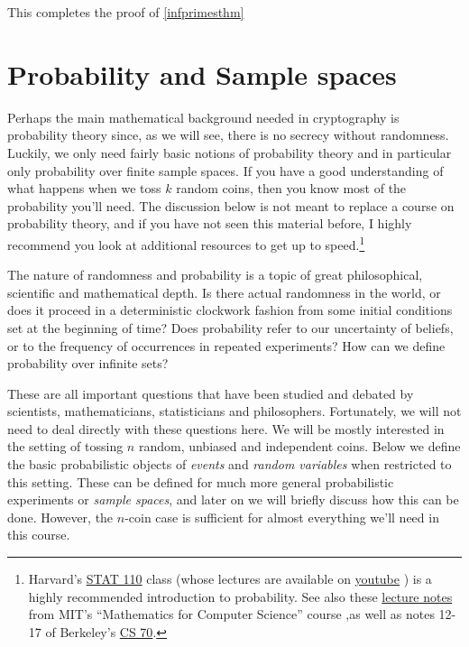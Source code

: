 This completes the proof of \cref{infprimesthm}

\section{Probability and Sample spaces}\label{0-Probability-and-Sample}

Perhaps the main mathematical background needed in cryptography is
probability theory since, as we will see, there is no secrecy without
randomness. Luckily, we only need fairly basic notions of probability
theory and in particular only probability over finite sample spaces. If
you have a good understanding of what happens when we toss \(k\) random
coins, then you know most of the probability you'll need. The discussion
below is not meant to replace a course on probability theory, and if you
have not seen this material before, I highly recommend you look at
additional resources to get up to speed.\footnote{Harvard's
  \href{http://projects.iq.harvard.edu/stat110/home}{STAT 110} class
  (whose lectures are available on
  \href{http://projects.iq.harvard.edu/stat110/youtube}{youtube} ) is a
  highly recommended introduction to probability. See also these
  \href{http://www.boazbarak.org/cs121/LLM_probability.pdf}{lecture
  notes} from MIT's ``Mathematics for Computer Science'' course ,as well
  as notes 12-17 of Berkeley's \href{https://www.eecs70.org/}{CS 70}.}

The nature of randomness and probability is a topic of great
philosophical, scientific and mathematical depth. Is there actual
randomness in the world, or does it proceed in a deterministic clockwork
fashion from some initial conditions set at the beginning of time? Does
probability refer to our uncertainty of beliefs, or to the frequency of
occurrences in repeated experiments? How can we define probability over
infinite sets?

These are all important questions that have been studied and debated by
scientists, mathematicians, statisticians and philosophers. Fortunately,
we will not need to deal directly with these questions here. We will be
mostly interested in the setting of tossing \(n\) random, unbiased and
independent coins. Below we define the basic probabilistic objects of
\emph{events} and \emph{random variables} when restricted to this
setting. These can be defined for much more general probabilistic
experiments or \emph{sample spaces}, and later on we will briefly
discuss how this can be done. However, the \(n\)-coin case is sufficient
for almost everything we'll need in this course.

